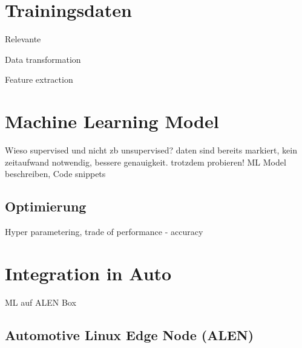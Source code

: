 \section{Trainingsdaten}
\label{sec:train_data}

Relevante

Data transformation

Feature extraction

\section{Machine Learning Model}
\label{sec:ml_implementation}

Wieso supervised und nicht zb unsupervised? daten sind bereits markiert, kein zeitaufwand notwendig, bessere genauigkeit. trotzdem probieren! ML Model beschreiben, Code snippets

\subsection{Optimierung}
\label{sec:ml_optimization}

Hyper parametering, trade of performance - accuracy

\section{Integration in Auto}
\label{sec:car_integration}

ML auf ALEN Box

\subsection{Automotive Linux Edge Node (ALEN)}
\label{sec:alen}